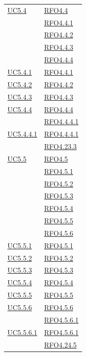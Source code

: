 \begin{longtable}{|>{\centering}m{5cm}|m{5cm}<{\centering}|}
\hyperref[UC5.4]{UC5.4} & \hyperlink{RFO4.4}{RFO4.4}\\
& \hyperlink{RFO4.4.1}{RFO4.4.1}\\
& \hyperlink{RFO4.4.2}{RFO4.4.2}\\
& \hyperlink{RFO4.4.3}{RFO4.4.3}\\
& \hyperlink{RFO4.4.4}{RFO4.4.4}\\ \hline
\hyperref[UC5.4.1]{UC5.4.1} & \hyperlink{RFO4.4.1}{RFO4.4.1}\\ \hline
\hyperref[UC5.4.2]{UC5.4.2} & \hyperlink{RFO4.4.2}{RFO4.4.2}\\ \hline
\hyperref[UC5.4.3]{UC5.4.3} & \hyperlink{RFO4.4.3}{RFO4.4.3}\\ \hline
\hyperref[UC5.4.4]{UC5.4.4} & \hyperlink{RFO4.4.4}{RFO4.4.4}\\
& \hyperlink{RFO4.4.4.1}{RFO4.4.4.1}\\ \hline
\hyperref[UC5.4.4.1]{UC5.4.4.1} & \hyperlink{RFO4.4.4.1}{RFO4.4.4.1}\\ & \hyperlink{RFO4.23.3}{RFO4.23.3}\\ \hline

\hyperref[UC5.5]{UC5.5} & \hyperlink{RFO4.5}{RFO4.5}\\
& \hyperlink{RFO4.5.1}{RFO4.5.1}\\
& \hyperlink{RFO4.5.2}{RFO4.5.2}\\
& \hyperlink{RFO4.5.3}{RFO4.5.3}\\
& \hyperlink{RFO4.5.4}{RFO4.5.4}\\
& \hyperlink{RFO4.5.5}{RFO4.5.5}\\
& \hyperlink{RFO4.5.6}{RFO4.5.6}\\ \hline
\hyperref[UC5.5.1]{UC5.5.1} & \hyperlink{RFO4.5.1}{RFO4.5.1}\\ \hline
\hyperref[UC5.5.2]{UC5.5.2} & \hyperlink{RFO4.5.2}{RFO4.5.2}\\ \hline
\hyperref[UC5.5.3]{UC5.5.3} & \hyperlink{RFO4.5.3}{RFO4.5.3}\\ \hline
\hyperref[UC5.5.4]{UC5.5.4} & \hyperlink{RFO4.5.4}{RFO4.5.4}\\ \hline
\hyperref[UC5.5.5]{UC5.5.5} & \hyperlink{RFO4.5.5}{RFO4.5.5}\\ \hline
\hyperref[UC5.5.6]{UC5.5.6} & \hyperlink{RFO4.5.6}{RFO4.5.6}\\
& \hyperlink{RFO4.5.6.1}{RFO4.5.6.1}\\ \hline
\hyperref[UC5.5.6.1]{UC5.5.6.1} & \hyperlink{RFO4.5.6.1}{RFO4.5.6.1}\\ & \hyperlink{RFO4.24.5}{RFO4.24.5}\\ \hline


\end{longtable}
